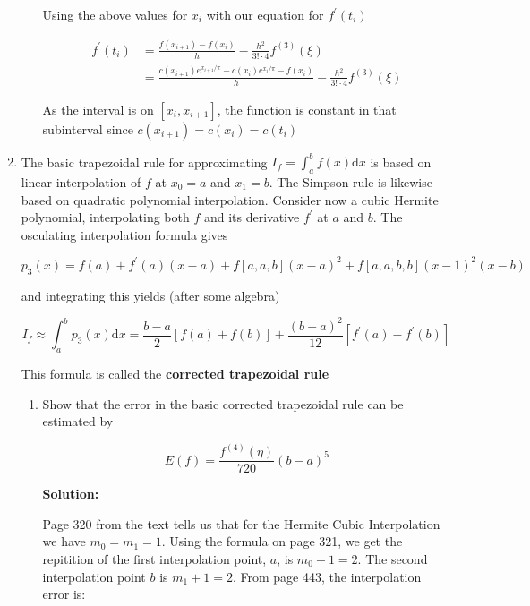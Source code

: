 \documentclass[12pt]{article}
\begin{document}
\begin{enumerate}
\begin{enumerate}
Using the above values for $x_{i}$ with our equation for $f^{\prime}(t_{i})$

\begin{align*}
f^{\prime}(t_{i}) &= \frac{f(x_{i+1}) - f(x_{i})}{h} - \frac{h^{2}}{3!\cdot 4}f^{(3)}(\xi)\\
                            &= \frac{c(x_{i+1})e^{x_{i+1}/\pi} - c(x_{i})e^{x_{i}/\pi} - f(x_{i})}{h} - \frac{h^{2}}{3!\cdot 4}f^{(3)}(\xi)
\end{align*}

As the interval is on $[x_{i}, x_{i+1}]$, the function is constant in that subinterval since $c(x_{i+1}) = c(x_{i}) = c(t_{i})$

\end{enumerate}

\newpage

\item The basic trapezoidal rule for approximating $I_{f} = \int_{a}^{b}f(x)\text{d}x$ is based on linear interpolation of $f$ at $x_{0} = a$ and $x_{1} = b$. The Simpson rule is likewise based on quadratic polynomial interpolation. Consider now a cubic Hermite polynomial, interpolating both $f$ and its derivative $f^{\prime}$ at $a$ and $b$. The osculating interpolation formula gives

\[
	p_{3}(x) = f(a) + f^{\prime}(a)(x-a) + f[a,a,b](x-a)^{2} + f[a,a,b,b](x-1)^{2}(x - b)
\]

and integrating this yields (after some algebra)

\[
	I_{f} \approx \int_{a}^{b} p_{3}(x)\text{d}x = \frac{b-a}{2}[f(a) + f(b)] + \frac{(b-a)^{2}}{12}[f^{\prime}(a) - f^{\prime}(b)]
\]

This formula is called the {\bf corrected trapezoidal rule}

\begin{enumerate}
\item Show that the error in the basic corrected trapezoidal rule can be estimated by

\[
	E(f) = \frac{f^{(4)}(\eta)}{720}(b-a)^{5}
\]

{\bf Solution:}

Page 320 from the text tells us that for the Hermite Cubic Interpolation we have $m_{0} = m_{1} = 1$. Using the formula on page 321, we get the repitition of the first interpolation point, $a$, is $m_{0} + 1 = 2$. The second interpolation point $b$ is $m_{1} + 1  = 2$. From page 443, the interpolation error is:


\end{enumerate}
\end{enumerate}
\end{document}
